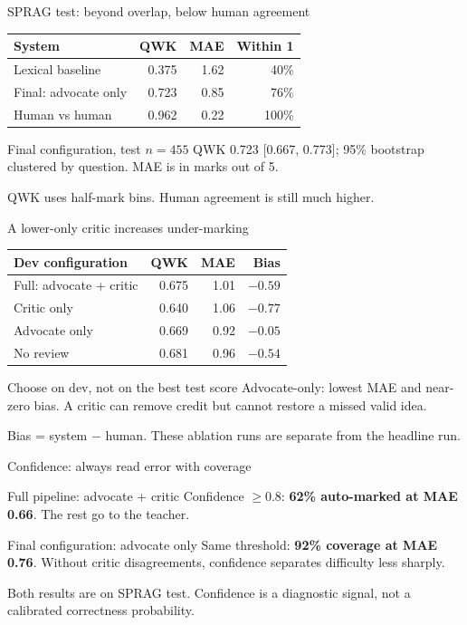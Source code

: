 \documentclass[14pt,aspectratio=169]{beamer}
\begin{document}
\begin{frame}{SPRAG test: beyond overlap, below human agreement}
\centering
\begin{tabular}{lrrr}
\toprule
System & QWK & MAE & Within 1 \\
\midrule
Lexical baseline & 0.375 & 1.62 & 40\% \\
Final: advocate only & 0.723 & 0.85 & 76\% \\
Human vs human & 0.962 & 0.22 & 100\% \\
\bottomrule
\end{tabular}
\begin{block}{Final configuration, test $n=455$}
QWK 0.723 [0.667, 0.773]; 95\% bootstrap clustered by question. MAE is in marks out of 5.
\end{block}
QWK uses half-mark bins. Human agreement is still much higher.
\end{frame}

\begin{frame}{A lower-only critic increases under-marking}
\centering
\begin{tabular}{lrrr}
\toprule
Dev configuration & QWK & MAE & Bias \\
\midrule
Full: advocate + critic & 0.675 & 1.01 & $-0.59$ \\
Critic only & 0.640 & 1.06 & $-0.77$ \\
Advocate only & 0.669 & 0.92 & $-0.05$ \\
No review & 0.681 & 0.96 & $-0.54$ \\
\bottomrule
\end{tabular}
\begin{block}{Choose on dev, not on the best test score}
Advocate-only: lowest MAE and near-zero bias. A critic can remove credit but cannot restore a missed valid idea.
\end{block}
Bias = system $-$ human. These ablation runs are separate from the headline run.
\end{frame}

\begin{frame}{Confidence: always read error with coverage}
\begin{block}{Full pipeline: advocate + critic}
Confidence $\geq 0.8$: \textbf{62\% auto-marked at MAE 0.66}. The rest go to the teacher.
\end{block}
\begin{block}{Final configuration: advocate only}
Same threshold: \textbf{92\% coverage at MAE 0.76}. Without critic disagreements, confidence separates difficulty less sharply.
\end{block}
Both results are on SPRAG test. Confidence is a diagnostic signal, not a calibrated correctness probability.
\end{frame}
\end{document}

